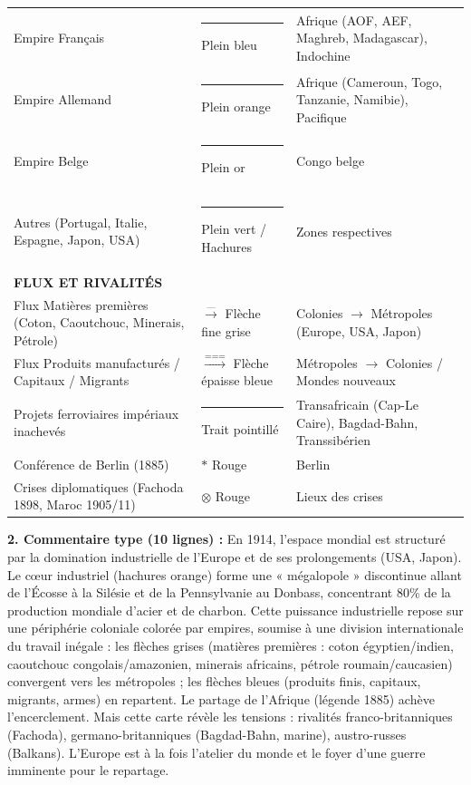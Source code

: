 \documentclass[11pt]{article}
\newcommand{\cle}[1]{{\popxbold\color{popdark}#1}}
\def\star{\mathbin{\ast}}\def\bigstar{\mathord{\ast}}%
\begin{document}
\begin{exoresolu}
\begin{center}
\begin{tabular}{|l|l|l|}
Empire Français & \textcolor{popblue}{\rule{1cm}{2pt}} Plein bleu & Afrique (AOF, AEF, Maghreb, Madagascar), Indochine \\
Empire Allemand & \textcolor{poporange}{\rule{1cm}{2pt}} Plein orange & Afrique (Cameroun, Togo, Tanzanie, Namibie), Pacifique \\
Empire Belge & \textcolor{popgold}{\rule{1cm}{2pt}} Plein or & Congo belge \\
Autres (Portugal, Italie, Espagne, Japon, USA) & \textcolor{popgreen}{\rule{1cm}{2pt}} Plein vert / Hachures & Zones respectives \\
\hline
\textbf{FLUX ET RIVALITÉS} & & \\
Flux Matières premières (Coton, Caoutchouc, Minerais, Pétrole) & $\xrightarrow{\text{---}}$ Flèche fine \textcolor{popmuted}{grise} & Colonies $\rightarrow$ Métropoles (Europe, USA, Japon) \\
Flux Produits manufacturés / Capitaux / Migrants & $\xrightarrow{\text{===}}$ Flèche épaisse \textcolor{popblue}{bleue} & Métropoles $\rightarrow$ Colonies / Mondes nouveaux \\
Projets ferroviaires impériaux inachevés & \textcolor{popdark}{\rule{1cm}{2pt}} Trait pointillé & Transafricain (Cap-Le Caire), Bagdad-Bahn, Transsibérien \\
Conférence de Berlin (1885) & $\star$ Rouge & Berlin \\
Crises diplomatiques (Fachoda 1898, Maroc 1905/11) & $\otimes$ Rouge & Lieux des crises \\
\hline
\end{tabular}
\end{center}

\textbf{2. Commentaire type (10 lignes) :}
En 1914, l'espace mondial est structuré par la domination industrielle de l'Europe et de ses prolongements (USA, Japon). Le \cle{cœur industriel} (hachures orange) forme une « mégalopole » discontinue allant de l'Écosse à la Silésie et de la Pennsylvanie au Donbass, concentrant 80\% de la production mondiale d'acier et de charbon. Cette puissance industrielle repose sur une \cle{périphérie coloniale} colorée par empires, soumise à une \cle{division internationale du travail} inégale : les flèches grises (matières premières : coton égyptien/indien, caoutchouc congolais/amazonien, minerais africains, pétrole roumain/caucasien) convergent vers les métropoles ; les flèches bleues (produits finis, capitaux, migrants, armes) en repartent. Le partage de l'Afrique (légende 1885) achève l'encerclement. Mais cette carte révèle les \cle{tensions} : rivalités franco-britanniques (Fachoda), germano-britanniques (Bagdad-Bahn, marine), austro-russes (Balkans). L'Europe est à la fois l'atelier du monde et le foyer d'une guerre imminente pour le repartage.
\end{exoresolu}
\end{document}
